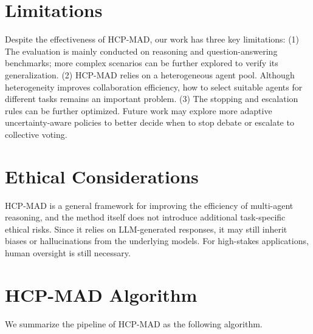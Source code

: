 \documentclass[11pt]{article}
\begin{document}
\section*{Limitations}

Despite the effectiveness of HCP-MAD, our work has three key limitations:
(1) The evaluation is mainly conducted on reasoning and question-answering benchmarks; more complex scenarios can be further explored to verify its generalization.
(2) HCP-MAD relies on a heterogeneous agent pool. Although heterogeneity improves collaboration efficiency, how to select suitable agents for different tasks remains an important problem.
(3) The stopping and escalation rules  can be further optimized. Future work may explore more adaptive uncertainty-aware policies to better decide when to stop debate or escalate to collective voting.

\section*{Ethical Considerations}

HCP-MAD is a general framework for improving the efficiency of multi-agent reasoning, and the method itself does not introduce additional task-specific ethical risks. 
Since it relies on LLM-generated responses, it may still inherit biases or hallucinations from the underlying models. 
For high-stakes applications, human oversight is still necessary.

\appendix %
\section{HCP-MAD Algorithm}
We summarize the pipeline of HCP-MAD as the following algorithm. 
\end{document}
